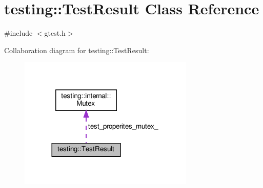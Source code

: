\hypertarget{classtesting_1_1TestResult}{}\section{testing\+:\+:Test\+Result Class Reference}
\label{classtesting_1_1TestResult}


{\ttfamily \#include $<$gtest.\+h$>$}



Collaboration diagram for testing\+:\+:Test\+Result\+:\nopagebreak
\begin{figure}[H]
\begin{center}
\leavevmode
\includegraphics[width=236pt]{classtesting_1_1TestResult__coll__graph}
\end{center}
\end{figure}
